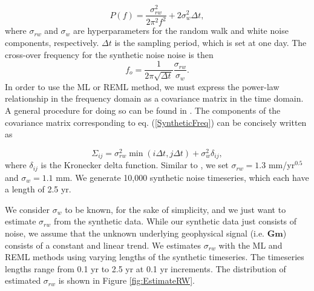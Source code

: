 \documentclass[10pt,a4paper]{article}
\begin{document}
\begin{equation}\label{SyntheticFreq}
P(f) = \frac{\sigma_{rw}^2}{2\pi^2 f^2} + 2\sigma_w^2\Delta t,
\end{equation}  
where $\sigma_{rw}$ and $\sigma_w$ are hyperparameters for the random walk and white noise components, respectively. $\Delta t$ is the sampling period, which is set at one day. The cross-over frequency for the synthetic noise noise is then
\begin{equation}\label{Crossover}
f_o = \frac{1}{2\pi\sqrt{\Delta t}}\frac{\sigma_{rw}}{\sigma_w}.  
\end{equation}
In order to use the ML or REML method, we must express the power-law relationship in the frequency domain as a covariance matrix in the time domain. A general procedure for doing  so can be found in \citet{Langbein2004}. The components of the covariance matrix corresponding to eq. (\ref{SyntheticFreq}) can be concisely written as

\begin{equation}\label{Covariance}
\Sigma_{ij} = \sigma_{rw}^2 \min(i\Delta t,j\Delta t) + \sigma_w^2 \delta_{ij},
\end{equation} 
where $\delta_{ij}$ is the Kronecker delta function. Similar to \citet{Langbein2012}, we set $\sigma_{rw} = 1.3$ mm/yr$^{0.5}$ and $\sigma_w = 1.1$ mm. We generate 10,000 synthetic noise timeseries, which each have a length of 2.5 yr. 

We consider $\sigma_w$ to be known, for the sake of simplicity, and we just want to estimate $\sigma_{rw}$ from the synthetic data. While our synthetic data just consists of noise, we assume that the unknown underlying geophysical signal (i.e. $\mathbf{G}\mathbf{m}$) consists of a constant and linear trend. We estimates $\sigma_{rw}$ with the ML and REML methods using varying lengths of the synthetic timeseries. The timeseries lengths range from 0.1 yr to 2.5 yr at 0.1 yr increments. The distribution of estimated $\sigma_{rw}$ is shown in Figure \ref{fig:EstimateRW}.     
\end{document}
